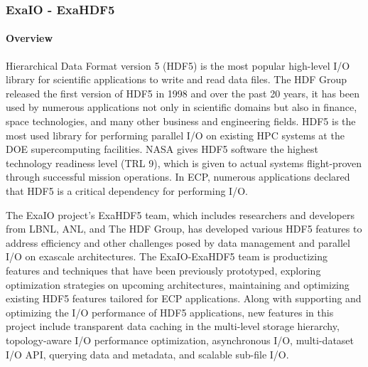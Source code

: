 \noindent

\subsubsection{ ExaIO - ExaHDF5}
\label{subsubsect:exahdf5}

\paragraph{Overview} 
Hierarchical Data Format version 5 (HDF5) is the most popular high-level I/O library for scientific applications to write and read data files.
The HDF Group released the first version of HDF5 in 1998 and over the past 20 years, it has been used by numerous applications not only in scientific domains but also in finance, space technologies, and many other business and engineering fields. HDF5 is the most used library for performing parallel I/O on existing HPC systems at the DOE supercomputing facilities. NASA gives HDF5 software the highest technology readiness level (TRL 9), which is given to actual systems flight-proven through successful mission operations. In ECP, numerous applications declared that HDF5 is a critical dependency for performing I/O.

The ExaIO project's ExaHDF5 team, which includes researchers and developers from LBNL, ANL, and The HDF Group, has developed various HDF5 features to address efficiency and other challenges posed by data management and parallel I/O on exascale architectures. The ExaIO-ExaHDF5 team is productizing features and techniques that have been previously prototyped, exploring optimization strategies on upcoming architectures, maintaining and optimizing existing HDF5 features tailored for ECP applications. Along with supporting and optimizing the I/O performance of HDF5 applications, new features in this project include transparent data caching in the multi-level storage hierarchy, topology-aware I/O performance optimization, asynchronous I/O, multi-dataset I/O API, querying data and metadata, and scalable sub-file I/O. 

